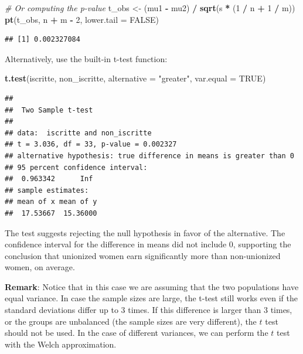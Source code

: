 \documentclass[
]{article}
\newenvironment{Shaded}{\begin{snugshade}}{\end{snugshade}}
\newcommand{\AttributeTok}[1]{\textcolor[rgb]{0.13,0.29,0.53}{#1}}
\newcommand{\CommentTok}[1]{\textcolor[rgb]{0.56,0.35,0.01}{\textit{#1}}}
\newcommand{\ConstantTok}[1]{\textcolor[rgb]{0.56,0.35,0.01}{#1}}
\newcommand{\DecValTok}[1]{\textcolor[rgb]{0.00,0.00,0.81}{#1}}
\newcommand{\FunctionTok}[1]{\textcolor[rgb]{0.13,0.29,0.53}{\textbf{#1}}}
\newcommand{\NormalTok}[1]{#1}
\newcommand{\OtherTok}[1]{\textcolor[rgb]{0.56,0.35,0.01}{#1}}
\newcommand{\SpecialCharTok}[1]{\textcolor[rgb]{0.81,0.36,0.00}{\textbf{#1}}}
\newcommand{\StringTok}[1]{\textcolor[rgb]{0.31,0.60,0.02}{#1}}
\begin{document}
\begin{Shaded}
\begin{Highlighting}[]
\CommentTok{\# Or computing the p{-}value}
\NormalTok{t\_obs }\OtherTok{\textless{}{-}}\NormalTok{ (mu1 }\SpecialCharTok{{-}}\NormalTok{ mu2) }\SpecialCharTok{/} \FunctionTok{sqrt}\NormalTok{(s }\SpecialCharTok{*}\NormalTok{ (}\DecValTok{1} \SpecialCharTok{/}\NormalTok{ n }\SpecialCharTok{+} \DecValTok{1} \SpecialCharTok{/}\NormalTok{ m))}
\FunctionTok{pt}\NormalTok{(t\_obs, n }\SpecialCharTok{+}\NormalTok{ m }\SpecialCharTok{{-}} \DecValTok{2}\NormalTok{, }\AttributeTok{lower.tail =} \ConstantTok{FALSE}\NormalTok{)}
\end{Highlighting}
\end{Shaded}

\begin{verbatim}
## [1] 0.002327084
\end{verbatim}

Alternatively, use the built-in t-test function:

\begin{Shaded}
\begin{Highlighting}[]
\FunctionTok{t.test}\NormalTok{(iscritte, non\_iscritte, }\AttributeTok{alternative =} \StringTok{"greater"}\NormalTok{, }\AttributeTok{var.equal =} \ConstantTok{TRUE}\NormalTok{)}
\end{Highlighting}
\end{Shaded}

\begin{verbatim}
## 
##  Two Sample t-test
## 
## data:  iscritte and non_iscritte
## t = 3.036, df = 33, p-value = 0.002327
## alternative hypothesis: true difference in means is greater than 0
## 95 percent confidence interval:
##  0.963342      Inf
## sample estimates:
## mean of x mean of y 
##  17.53667  15.36000
\end{verbatim}

The test suggests rejecting the null hypothesis in favor of the
alternative. The confidence interval for the difference in means did not
include 0, supporting the conclusion that unionized women earn
significantly more than non-unionized women, on average.

\textbf{Remark}: Notice that in this case we are assuming that the two
populations have equal variance. In case the sample sizes are large, the
t-test still works even if the standard deviations differ up to 3 times.
If this difference is larger than 3 times, or the groups are unbalanced
(the sample sizes are very different), the \(t\) test should not be
used. In the case of different variances, we can perform the \(t\) test
with the Welch approximation.
\end{document}

